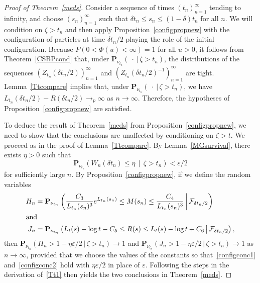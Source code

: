 \documentclass[10pt]{amsart}
\theoremstyle{definition}\newtheorem{defi}[theo]{Definition}\newtheorem{rema}[theo]{Remark}\newtheorem{exam}[theo]{Example}\newtheorem{exem}[theo]{Example}\newtheorem{nota}[theo]{Notation}
\newcommand*\eps{\varepsilon}
\renewcommand*\P{\mathbf{P}}
\newcommand\F{\mathcal{F}}
\newcommand{\1} {\mathds{1}}
\begin{document}
\begin{proof}[Proof of Theorem~\ref{meds}]
Consider a sequence of times $(t_n)_{n=1}^{\infty}$ tending to infinity, and choose $(s_n)_{n=1}^{\infty}$ such that $\delta t_n \leq s_n \leq (1 - \delta) t_n$ for all $n$. We will condition on $\zeta > t_n$ and then apply Proposition~\ref{configpropnew} with the configuration of particles at time $\delta t_n/2$ playing the role of the initial configuration. Because $P(0 < \Phi(u) < \infty) = 1$ for all $u > 0$, it follows from Theorem~\ref{CSBPcond} that, under $\P_{\nu_{t_n}}(\:\cdot\:|\,\zeta > t_n)$, the distributions of the sequences $(Z_{t_n}(\delta t_n/2))_{n=1}^{\infty}$ and $(Z_{t_n}(\delta t_n/2)^{-1})_{n=1}^{\infty}$ are tight. Lemma~\ref{Ttcompare} implies that, under $\P_{\nu_{t_n}}(\:\cdot\:|\,\zeta > t_n)$, we have $L_{t_n}(\delta t_n/2) - R(\delta t_n/2) \rightarrow_p \infty$ as $n \rightarrow \infty$. Therefore, the hypotheses of Proposition~\ref{configpropnew} are satisfied.

To deduce the result of Theorem~\ref{meds} from Proposition~\ref{configpropnew}, we need to show that the conclusions are unaffected by conditioning on $\zeta > t$. We proceed as in the proof of Lemma~\ref{Ttcompare}. By Lemma~\ref{MGsurvival}, there exists $\eta > 0$ such that
\[
\P_{\nu_{t_n}}\left(W_n(\delta t_n) \leq \eta \,\middle|\,\zeta > t_n\right) < \eps/2
\]
for sufficiently large $n$. By Proposition~\ref{configpropnew}, if we define the random variables
\begin{align*}
H_n &= \P_{\nu_{t_n}} \left(\frac{C_3}{L_{t_n}(s_n)^3} e^{L_{t_n}(s_n)} \leq M(s_n) \leq \frac{C_4}{L_{t_n}(s_n)^3} \,\middle|\, \F_{\delta t_n/2} \right)
\\
\intertext{and}
J_n &= \P_{\nu_{t_n}}\left(L_t(s) - \log t - C_5 \leq R(s) \leq L_t(s) - \log t + C_6 \, \middle| \, \F_{\delta t_n/2} \right),
\end{align*}
then $\P_{\nu_{t_n}}(H_n > 1 - \eta \eps/2 \,|\, \zeta > t_n) \rightarrow 1$ and $\P_{\nu_{t_n}}(J_n > 1 - \eta \eps/2 \,|\, \zeta > t_n) \rightarrow 1$ as $n \rightarrow \infty$, provided that we choose the values of the constants so that~\eqref{configconc1} and~\eqref{configconc2} hold with $\eta \eps/2$ in place of $\eps$.
Following the steps in the derivation of~\eqref{Tt1} then yields the two conclusions in Theorem~\ref{meds}.
\end{proof}
\end{document}
